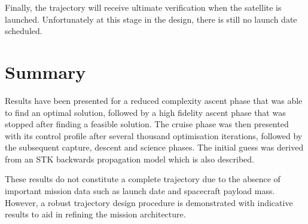 
Finally, the trajectory will receive ultimate verification when the satellite is launched. Unfortunately at this stage in the design, there is still no launch date scheduled.





\section{Summary} \label{sec:Results-summary}

Results have been presented for a reduced complexity ascent phase that was able to find an optimal solution, followed by a high fidelity ascent phase that was stopped after finding a feasible solution. The cruise phase was then presented with its control profile after several thousand optimisation iterations, followed by the subsequent capture, descent and science phases. The initial guess was derived from an STK backwards propagation model which is also described.

These results do not constitute a complete trajectory due to the absence of important mission data such as launch date and spacecraft payload mass. However, a robust trajectory design procedure is demonstrated with indicative results to aid in refining the mission architecture. 

